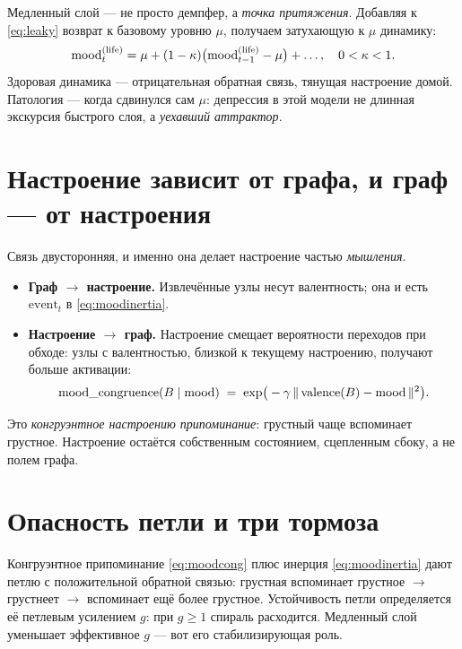 Медленный слой — не просто демпфер, а \emph{точка притяжения}. Добавляя к
\eqref{eq:leaky} возврат к базовому уровню $\mu$, получаем затухающую к $\mu$
динамику:
\[
\mathrm{mood}^{(\text{life})}_t=\mu+(1-\kappa)\big(\mathrm{mood}^{(\text{life})}_{t-1}-\mu\big)+\ldots,\quad 0<\kappa<1 .
\]
Здоровая динамика — отрицательная обратная связь, тянущая настроение домой. Патология
— когда сдвинулся сам $\mu$: депрессия в этой модели не длинная экскурсия быстрого
слоя, а \emph{уехавший аттрактор}.

\section{Настроение зависит от графа, и граф — от настроения}

Связь двусторонняя, и именно она делает настроение частью \emph{мышления}.

\begin{itemize}
\item \textbf{Граф $\to$ настроение.} Извлечённые узлы несут валентность; она и есть
$\text{event}_t$ в \eqref{eq:moodinertia}.
\item \textbf{Настроение $\to$ граф.} Настроение смещает вероятности переходов при
обходе: узлы с валентностью, близкой к текущему настроению, получают больше
активации:
\begin{equation}
\text{mood\_congruence}(B\mid \mathrm{mood})\;=\;\exp\!\big(-\gamma\,\|\,\text{valence}(B)-\mathrm{mood}\,\|^2\big).
\label{eq:moodcong}
\end{equation}
\end{itemize}
Это \emph{конгруэнтное настроению припоминание}: грустный чаще вспоминает грустное.
Настроение остаётся собственным состоянием, сцепленным сбоку, а не полем графа.

\section{Опасность петли и три тормоза}

\begin{pitfall}[Руминация]
Конгруэнтное припоминание \eqref{eq:moodcong} плюс инерция \eqref{eq:moodinertia}
дают петлю с положительной обратной связью: грустная вспоминает грустное $\to$
грустнеет $\to$ вспоминает ещё более грустное. Устойчивость петли определяется её
петлевым усилением $g$: при $g\ge 1$ спираль расходится. Медленный слой уменьшает
эффективное $g$ — вот его стабилизирующая роль.
\end{pitfall}

